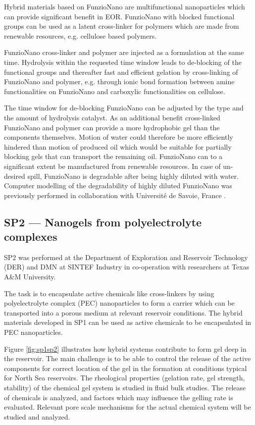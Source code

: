 Hybrid materials based on FunzioNano are multifunctional nanoparticles which can provide significant benefit in EOR. FunzioNano with blocked functional groups can be used as a latent cross-linker for polymers which are made from renewable resources, e.g. cellulose based polymers. 

FunzioNano cross-linker and polymer are injected as a formulation at the same time. Hydrolysis within the requested time window leads to de-blocking of the functional groups and thereafter fast and efficient gelation by cross-linking of FunzioNano and polymer, e.g. through ionic bond formation between amine functionalities on FunzioNano and carboxylic functionalities on cellulose.

The time window for de-blocking FunzioNano can be adjusted by the type and the amount of hydrolysis catalyst. As an additional benefit cross-linked FunzioNano and polymer can provide a more hydrophobic gel than the components themselves. Motion of water could therefore be more efficiently hindered than motion of produced oil which would be suitable for partially blocking gels that can transport the remaining oil. FunzioNano can to a significant extent be manufactured from renewable resources. In case of un-desired spill, FunzioNano is degradable after being highly diluted with water. Computer modelling of the degradability of highly diluted FunzioNano was previously performed in collaboration with Université de Savoie, France \citep{Neyertz2012,Neyertz2013}.

\subsection*{SP2 --- Nanogels from polyelectrolyte complexes}

SP2 was performed at the Department of Exploration and Reservoir Technology (DER) and DMN at SINTEF Industry in co-operation with researchers at Texas A\&M University.

The task is to encapsulate active chemicals like cross-linkers by using polyelectrolyte complex  (PEC) nanoparticles to form a carrier which can be transported into a porous medium at relevant reservoir conditions. The hybrid materials developed in SP1 can be used as active chemicals to be encapsulated in PEC nanoparticles. 

Figure \ref{fig:sp1sp2} illustrates how hybrid systems contribute to form gel deep in the reservoir. The main challenge is to be able to control the release of the active components for correct location of the gel in the formation at conditions typical for North Sea reservoirs. The rheological properties (gelation rate, gel strength, stability) of the chemical gel system is studied in fluid bulk studies. The release of chemicals is analyzed, and factors which may influence the gelling rate is evaluated. Relevant pore scale mechanisms for the actual chemical system will be studied and analyzed.


